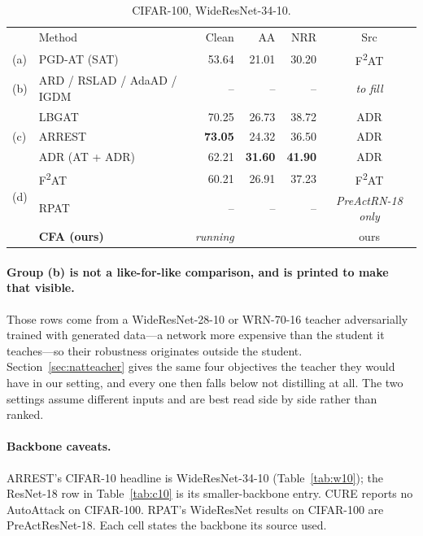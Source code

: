 \begin{table}[t]
  \centering
  \caption{CIFAR-100, WideResNet-34-10.}
  \label{tab:w100}
  \begin{tabular}{llrrrc}
    \toprule
    & Method & Clean & AA & NRR & Src \\
    (a) & PGD-AT (SAT) & 53.64 & 21.01 & 30.20 & F\textsuperscript{2}AT \\
    \midrule
    (b) & ARD / RSLAD / AdaAD / IGDM & -- & -- & -- & \emph{to fill} \\
    \midrule
    \multirow{3}{*}{(c)} & LBGAT & 70.25 & 26.73 & 38.72 & ADR \\
     & ARREST & \textbf{73.05} & 24.32 & 36.50 & ADR \\
     & ADR (AT + ADR) & 62.21 & \textbf{31.60} & \textbf{41.90} & ADR \\
    \midrule
    \multirow{2}{*}{(d)} & F\textsuperscript{2}AT & 60.21 & 26.91 & 37.23 & F\textsuperscript{2}AT \\
     & RPAT & -- & -- & -- & \emph{PreActRN-18 only} \\
    \midrule
    & \textbf{CFA (ours)} & \emph{running} & & & ours \\
    \bottomrule
  \end{tabular}
\end{table}
\paragraph{Group (b) is not a like-for-like comparison, and is printed to make that visible.}
Those rows come from a WideResNet-28-10 or WRN-70-16 teacher adversarially trained with generated
data---a network more expensive than the student it teaches---so their robustness originates outside
the student. Section~\ref{sec:natteacher} gives the same four objectives the teacher they would have
in our setting, and every one then falls below not distilling at all. The two settings assume
different inputs and are best read side by side rather than ranked.

\paragraph{Backbone caveats.} ARREST's CIFAR-10 headline is WideResNet-34-10
(Table~\ref{tab:w10}); the ResNet-18 row in Table~\ref{tab:c10} is its smaller-backbone entry. CURE
reports no AutoAttack on CIFAR-100. RPAT's WideResNet results on CIFAR-100 are PreActResNet-18. Each
cell states the backbone its source used.


